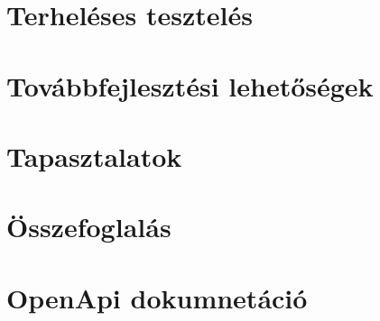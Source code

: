 \chapter{Terheléses tesztelés}
\pagestyle{main}



\chapter{Továbbfejlesztési lehetőségek}
\pagestyle{main}



\chapter{Tapasztalatok}
\pagestyle{main}




\chapter*{Összefoglalás}\label{ch:osszefoglalas}
\pagestyle{plain}


\newpage






\appendix
\chapter{OpenApi dokumnetáció}\label{appendix:openapi}



